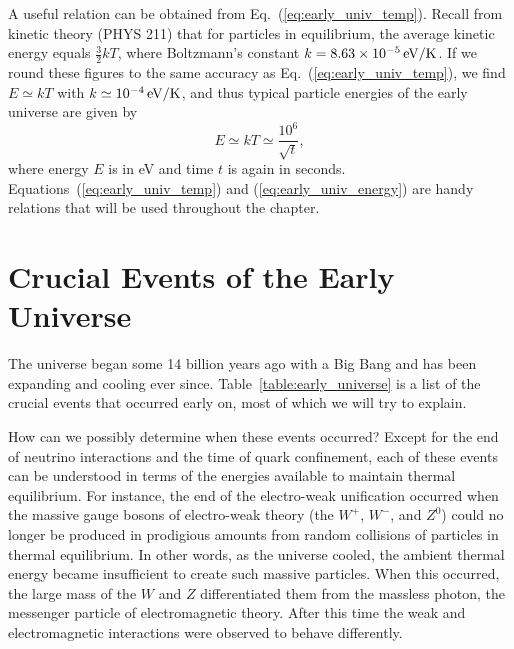 A useful relation can be obtained from Eq.~(\ref{eq:early_univ_temp}).
Recall from kinetic theory (PHYS 211) that for particles in
equilibrium, the average kinetic energy equals $\frac{3}{2}kT$, where
Boltzmann's constant $k= 8.63\times 10^{-5}\,\mbox{eV/K}$.  If we round these
figures to the same accuracy as Eq.~(\ref{eq:early_univ_temp}), we
find $E \simeq kT$ with $k \simeq 10^{-4}\,\mbox{eV/K}$, and thus typical
particle energies of the early universe are given by
\begin{equation}
\label{eq:early_univ_energy}
E \simeq kT \simeq \frac{10^6}{\sqrt t},
\end{equation}
where energy $E$ is in eV and time $t$ is again in seconds.
Equations~(\ref{eq:early_univ_temp}) and (\ref{eq:early_univ_energy})
are handy relations that will be used throughout the chapter.

\section{Crucial Events of the Early Universe}
\label{sec:crucial_events}

The universe began some 14 billion years ago with a Big Bang and
has been expanding and cooling ever
since. Table~\ref{table:early_universe} is a list of the crucial
events that occurred early on, most of which we will try to explain.

How can we possibly determine when these events occurred? Except for
the end of neutrino interactions and the time of quark confinement,
each of these events can be understood in terms of the energies
available to maintain thermal equilibrium.  For instance, the end of
the electro-weak unification occurred when the massive gauge bosons of
electro-weak theory (the $W^+$, $W^-$, and $Z^0$) could no longer be
produced in prodigious amounts from random collisions of particles in
thermal equilibrium.  In other words, as the universe cooled, the
ambient thermal energy became insufficient to create such massive
particles.  When this occurred, the large mass of the $W$ and $Z$
differentiated them from the massless photon, the messenger particle
of electromagnetic theory.  After this time the weak and
electromagnetic interactions were observed to behave differently.

